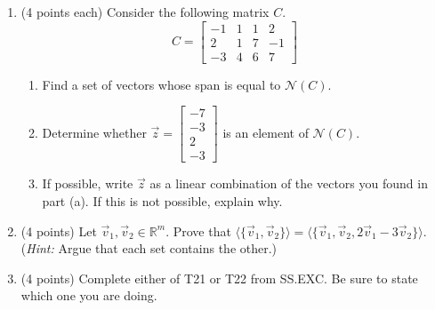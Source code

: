 \documentclass[11pt]{article}
\theoremstyle{definition}
\begin{document}
\begin{enumerate}
\item (4 points each) Consider the following matrix $C$.
\[C=\begin{bmatrix}
-1 & 1 & 1 & 2\\
2 & 1 & 7 & -1\\
-3 & 4 & 6 & 7
\end{bmatrix}\]

\begin{enumerate}

\item Find a set of vectors whose span is equal to $\mathcal{N}(C)$.

\item Determine whether $\displaystyle \vec{z}=\begin{bmatrix}-7\\ -3\\ 2\\ -3\end{bmatrix}$ is an element of $\mathcal{N}(C)$.

\item If possible, write $\vec{z}$ as a linear combination of the vectors you found in part (a).  If this is not possible, explain why.

\end{enumerate}

\item (4 points) Let $\vec{v}_{1},\vec{v}_{2}\in\mathbb{R}^{m}$.  Prove that $\langle\{\vec{v}_{1},\vec{v}_{2}\}\rangle=\langle\{\vec{v}_{1},\vec{v}_{2},2\vec{v}_{1}-3\vec{v}_{2}\}\rangle$.  (\emph{Hint:} Argue that each set contains the other.)

\item (4 points) Complete either of T21 or T22 from SS.EXC.  Be sure to state which one you are doing.

\end{enumerate}
\end{document}
